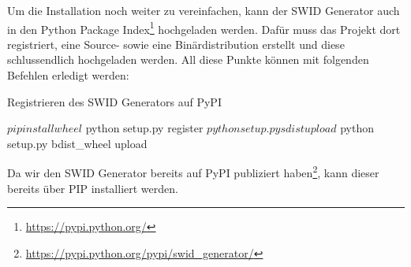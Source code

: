 Um die Installation noch weiter zu vereinfachen, kann der SWID Generator auch in
den Python Package Index\footnote{\url{https://pypi.python.org/}} hochgeladen
werden. Dafür muss das Projekt dort registriert, eine Source-
sowie eine Binärdistribution erstellt und diese schlussendlich
hochgeladen werden. All diese Punkte können mit folgenden Befehlen erledigt
werden:

\begin{listing}[H]
\caption{Registrieren des SWID Generators auf PyPI}
\begin{bashcode}
$ pip install wheel
$ python setup.py register
$ python setup.py sdist upload
$ python setup.py bdist_wheel upload
\end{bashcode}
\end{listing}

Da wir den SWID Generator bereits auf PyPI publiziert
haben\footnote{\url{https://pypi.python.org/pypi/swid_generator/}}, kann dieser
bereits über PIP installiert werden.

